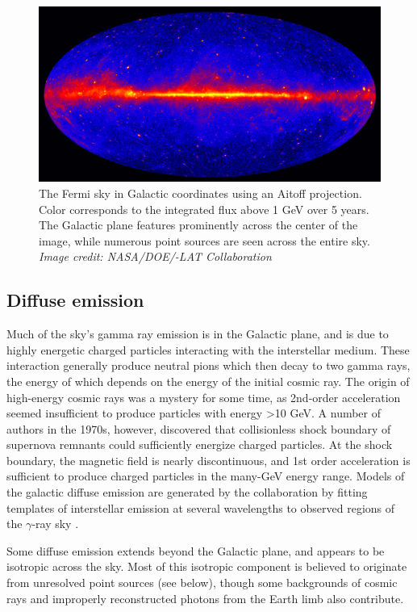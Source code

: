 \begin{figure}
\begin{center}
\includegraphics[width=0.9\columnwidth]{figures/Fermi_5_year.jpg}
\caption{
\label{fig:fermi5year}
The Fermi sky in Galactic coordinates using an Aitoff projection.
Color corresponds to the integrated flux above 1 GeV over 5 years.
The Galactic plane features prominently across the center of the image, while numerous point sources are seen across the entire sky.
{\it Image credit: NASA/DOE/\Fermi-LAT Collaboration}
}
\end{center}
\end{figure}
\subsection{Diffuse emission}
Much of the sky's gamma ray emission is in the Galactic plane, and is due to highly energetic charged particles interacting with the interstellar medium. These interaction generally produce neutral pions which then decay to two gamma rays, the energy of which depends on the energy of the initial cosmic ray. 
The origin of high-energy cosmic rays was a mystery for some time, as 2nd-order \Fermi acceleration seemed insufficient to produce particles with energy >10 GeV. A number of authors in the 1970s, however, discovered that collisionless shock boundary of supernova remnants could sufficiently energize charged particles. At the shock boundary, the magnetic field is nearly discontinuous, and 1st order \Fermi acceleration is sufficient to produce charged particles in the many-GeV energy range.
Models of the galactic diffuse emission are generated by the \FermiLAT collaboration by fitting templates of interstellar emission at several wavelengths to observed regions of the $\gamma$-ray sky \cite{acero_development_2016}.
 
Some diffuse emission extends beyond the Galactic plane, and appears to be isotropic across the sky. Most of this isotropic component is believed to originate from unresolved point sources (see below), though some backgrounds of cosmic rays and improperly reconstructed photons from the Earth limb also contribute.
